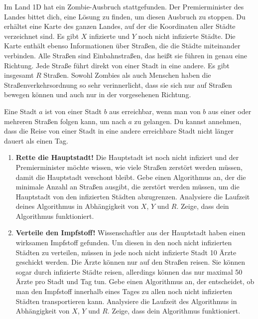 \documentclass{uebung_cs}
\begin{document}
\begin{aufgabe}
    Im Land 1D hat ein Zombie-Ausbruch stattgefunden. Der Premierminister des Landes bittet dich, eine Lösung zu finden, um diesen Ausbruch zu stoppen. Du erhältst eine Karte des ganzen Landes, auf der die Koordinaten aller Städte verzeichnet sind. Es gibt $X$ infizierte und $Y$ noch nicht infizierte Städte. Die Karte enthält ebenso Informationen über Straßen, die die Städte miteinander verbinden. Alle Straßen sind Einbahnstraßen, das heißt sie führen in genau eine Richtung. Jede Straße führt direkt von einer Stadt in eine andere. Es gibt insgesamt $R$ Straßen. Sowohl Zombies als auch Menschen haben die Straßenverkehrsordnung so sehr verinnerlicht, dass sie sich nur auf Straßen bewegen können und auch nur in der vorgesehenen Richtung.
 
    Eine Stadt $a$ ist von einer Stadt $b$ aus erreichbar, wenn man von $b$ aus einer oder mehreren Straßen folgen kann, um nach $a$ zu gelangen. Du kannst annehmen, dass die Reise von einer Stadt in eine andere erreichbare Stadt nicht länger dauert als einen Tag.
    \begin{enumerate}
        \item \textbf{Rette die Hauptstadt!} Die Hauptstadt ist noch nicht infiziert und der Premierminister möchte wissen, wie viele Straßen zerstört werden müssen, damit die Hauptstadt verschont bleibt. Gebe einen Algorithmus an, der die minimale Anzahl an Straßen ausgibt, die zerstört werden müssen, um die Hauptstadt von den infizierten Städten abzugrenzen. Analysiere die Laufzeit deines Algorithmus in Abhängigkeit von $X$, $Y$ und $R$. Zeige, dass dein Algorithmus funktioniert. \\
        \item \textbf{Verteile den Impfstoff!} Wissenschaftler aus der Hauptstadt haben einen wirksamen Impfstoff gefunden. Um diesen in den noch nicht infizierten Städten zu verteilen, müssen in jede noch nicht infizierte Stadt 10 Ärzte geschickt werden. Die Ärzte können nur auf den Straßen reisen. Sie können sogar durch infizierte Städte reisen, allerdings können das nur maximal 50 Ärzte pro Stadt und Tag tun. Gebe einen Algorithmus an, der entscheidet, ob man den Impfstoff innerhalb eines Tages zu allen noch nicht infizierten Städten transportieren kann. Analysiere die Laufzeit des Algorithmus in Abhängigkeit von $X$, $Y$ und $R$. Zeige, dass dein Algorithmus funktioniert.
    \end{enumerate}
\end{aufgabe}
\end{document}
